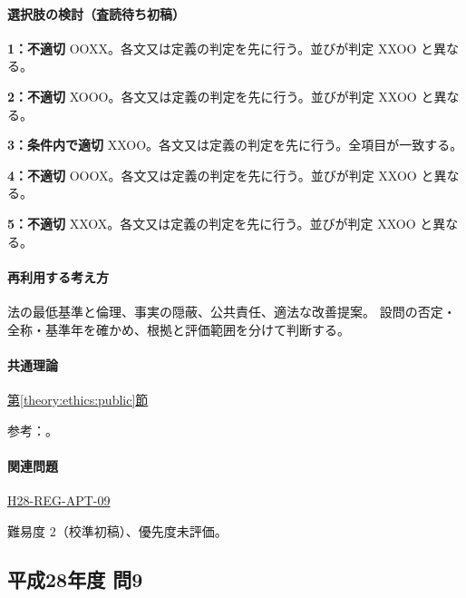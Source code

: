 \paragraph{選択肢の検討（査読待ち初稿）}\mbox{}\par

\noindent\textbf{1：不適切} OOXX。各文又は定義の判定を先に行う。並びが判定 XXOO と異なる。\par

\noindent\textbf{2：不適切} XOOO。各文又は定義の判定を先に行う。並びが判定 XXOO と異なる。\par

\noindent\textbf{3：条件内で適切} XXOO。各文又は定義の判定を先に行う。全項目が一致する。\par

\noindent\textbf{4：不適切} OOOX。各文又は定義の判定を先に行う。並びが判定 XXOO と異なる。\par

\noindent\textbf{5：不適切} XXOX。各文又は定義の判定を先に行う。並びが判定 XXOO と異なる。\par

\paragraph{再利用する考え方} 法の最低基準と倫理、事実の隠蔽、公共責任、適法な改善提案。 設問の否定・全称・基準年を確かめ、根拠と評価範囲を分けて判断する。

\paragraph{共通理論} \hyperref[theory:ethics:public]{第\ref*{theory:ethics:public}節}

\par 参考：\cite{ipej_ethics2011}。

\paragraph{関連問題} \hyperref[q:h28-reg-apt-09]{H28-REG-APT-09}

\par 難易度 2（校準初稿）、優先度未評価。

\subsection{平成28年度 問9}
\label{q:h28-reg-apt-09}

